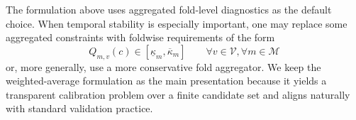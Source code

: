 \documentclass[12pt, draft]{article}
\theoremstyle{plain}
\theoremstyle{definition}
\newcommand{\1}{\mathbf{1}}
\begin{document}

The formulation above uses aggregated fold-level diagnostics as the default choice. When temporal stability is especially important, one may replace some aggregated constraints with foldwise requirements of the form
\[
Q_{m,v}(c)\in[\underline{\kappa}_m,\overline{\kappa}_m]
\qquad
\forall v\in\mathcal V, \forall m \in \mathcal M
\]
or, more generally, use a more conservative fold aggregator. We keep the weighted-average formulation as the main presentation because it yields a transparent calibration problem over a finite candidate set and aligns naturally with standard validation practice.
\end{document}
